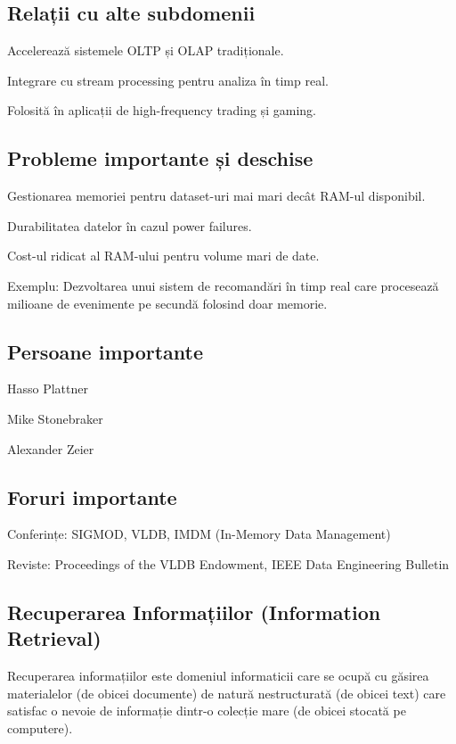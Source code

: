 \documentclass[12pt]{article}
\begin{document}
\subsection*{Relații cu alte subdomenii}

Accelerează sistemele OLTP și OLAP tradiționale.

Integrare cu stream processing pentru analiza în timp real.

Folosită în aplicații de high-frequency trading și gaming.

\subsection*{Probleme importante și deschise}

Gestionarea memoriei pentru dataset-uri mai mari decât RAM-ul disponibil.

Durabilitatea datelor în cazul power failures.

Cost-ul ridicat al RAM-ului pentru volume mari de date.

Exemplu: Dezvoltarea unui sistem de recomandări în timp real care procesează milioane de evenimente pe secundă folosind doar memorie.

\subsection*{Persoane importante}

Hasso Plattner

Mike Stonebraker

Alexander Zeier

\subsection*{Foruri importante}

Conferințe: SIGMOD, VLDB, IMDM (In-Memory Data Management)

Reviste: Proceedings of the VLDB Endowment, IEEE Data Engineering Bulletin

\subsection*{Recuperarea Informațiilor (Information Retrieval)}

Recuperarea informațiilor este domeniul informaticii care se ocupă cu găsirea materialelor (de obicei documente) de natură nestructurată (de obicei text) care satisfac o nevoie de informație dintr-o colecție mare (de obicei stocată pe computere).
\end{document}
